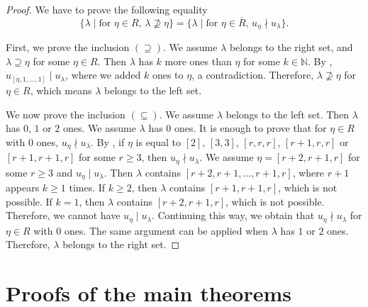\documentclass[a4paper, 12pt, reqno]{amsart}
\theoremstyle{remark}
\begin{document}
\begin{proof}
  We have to prove the following equality
  \begin{equation*}
    \{\lambda \mid \text{for $\eta \in R$, $\lambda \nsupseteq \eta$}\} = \{\lambda \mid \text{for $\eta \in \overline{R}$, $u_{\eta} \nmid u_{\lambda}$}\}.
  \end{equation*}

  First, we prove the inclusion $(\supseteq)$.
  We assume $\lambda$ belongs to the right set, and $\lambda \supseteq \eta$ for some $\eta \in R$.
  Then $\lambda$ has $k$ more ones than $\eta$ for some $k \in \mathbb{N}$.
  By , $u_{[\eta, 1, \dots, 1]} \mid u_{\lambda}$, where we added $k$ ones to $\eta$, a contradiction.
  Therefore, $\lambda \nsupseteq \eta$ for $\eta \in R$, which means $\lambda$ belongs to the left set.

  We now prove the inclusion $(\subseteq)$.
  We assume $\lambda$ belongs to the left set.
  Then $\lambda$ has $0$, $1$ or $2$ ones.
  We assume $\lambda$ has $0$ ones.
  It is enough to prove that for $\eta \in R$ with $0$ ones, $u_{\eta} \nmid u_{\lambda}$.
  By , if $\eta$ is equal to $[2]$, $[3, 3]$, $[r, r, r]$, $[r + 1, r, r]$ or $[r + 1, r + 1, r]$ for some $r \ge 3$, then $u_{\eta} \nmid u_{\lambda}$.
  We assume $\eta = [r + 2, r + 1, r]$ for some $r \ge 3$ and $u_{\eta} \mid u_{\lambda}$.
  Then $\lambda$ contains $[r + 2, r + 1, \dots, r + 1, r]$, where $r + 1$ appears $k \ge 1$ times.
  If $k \ge 2$, then $\lambda$ contains $[r + 1, r + 1, r]$, which is not possible.
  If $k = 1$, then $\lambda$ contains $[r + 2, r + 1, r]$, which is not possible.
  Therefore, we cannot have $u_{\eta} \mid u_{\lambda}$.
  Continuing this way, we obtain that $u_{\eta} \nmid u_{\lambda}$ for $\eta \in R$ with $0$ ones.
  The same argument can be applied when $\lambda$ has $1$ or $2$ ones.
  Therefore, $\lambda$ belongs to the right set.
\end{proof}

\section{Proofs of the main theorems}
\label{sec:proofs-main-theorems}
\end{document}
